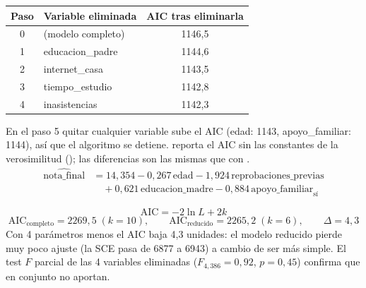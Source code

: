 \begin{center}\small
\begin{tabular}{clc}
\toprule
Paso & Variable eliminada & AIC tras eliminarla \\ \midrule
0 & (modelo completo) & 1146,5 \\
1 & educacion\_padre & 1144,6 \\
2 & internet\_casa & 1143,5 \\
3 & tiempo\_estudio & 1142,8 \\
4 & inasistencias & 1142,3 \\ \bottomrule
\end{tabular}
\end{center}
En el paso 5 quitar cualquier variable sube el AIC (edad: 1143, apoyo\_familiar: 1144), así que el algoritmo
se detiene.  reporta el AIC sin las constantes de la verosimilitud (); las
diferencias son las mismas que con .
\[
\begin{aligned}\widehat{\text{nota\_final}}&=14,354-0,267\,\text{edad}-1,924\,\text{reprobaciones\_previas}\\
&\quad+0,621\,\text{educacion\_madre}-0,884\,\text{apoyo\_familiar}_{\text{sí}}\end{aligned}
\]


\[
\text{AIC}=-2\ln L+2k
\]
\[
\text{AIC}_{\text{completo}}=2269,5\;(k=10),\qquad
\text{AIC}_{\text{reducido}}=2265,2\;(k=6),\qquad \Delta=4,3
\]
Con 4 parámetros menos el AIC baja 4,3 unidades: el modelo reducido pierde muy poco ajuste (la SCE pasa de
6877 a 6943) a cambio de ser más simple. El test $F$ parcial de las 4 variables eliminadas
($F_{4,386}=0,92$, $p=0,45$) confirma que en conjunto no aportan.


